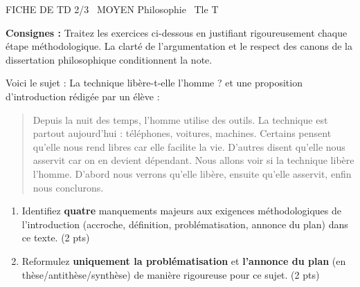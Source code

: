\documentclass[11pt]{article}
\begin{document}
\thispagestyle{empty}

\begin{tcolorbox}[enhanced,colback=popink,colframe=popink,arc=10pt,boxrule=0pt,left=12pt,right=12pt,top=9pt,bottom=9pt]
{\color{white}\popxbold\small FICHE DE TD 2/3 \textbullet\ MOYEN \hfill Philosophie \textbullet\ Tle T\par}
\end{tcolorbox}
\vspace{4pt}

\noindent \textbf{Consignes :} Traitez les exercices ci-dessous en justifiant rigoureusement chaque étape méthodologique. La clarté de l'argumentation et le respect des canons de la dissertation philosophique conditionnent la note.

\begin{exercice}
Voici le sujet : \og La technique libère-t-elle l'homme ? \fg{} et une proposition d'introduction rédigée par un élève :
\begin{quote}
\og Depuis la nuit des temps, l'homme utilise des outils. La technique est partout aujourd'hui : téléphones, voitures, machines. Certains pensent qu'elle nous rend libres car elle facilite la vie. D'autres disent qu'elle nous asservit car on en devient dépendant. Nous allons voir si la technique libère l'homme. D'abord nous verrons qu'elle libère, ensuite qu'elle asservit, enfin nous conclurons. \fg{}
\end{quote}
\begin{enumerate}
    \item Identifiez \textbf{quatre} manquements majeurs aux exigences méthodologiques de l'introduction (accroche, définition, problématisation, annonce du plan) dans ce texte. (2 pts)
    \item Reformulez \textbf{uniquement la problématisation} et \textbf{l'annonce du plan} (en thèse/antithèse/synthèse) de manière rigoureuse pour ce sujet. (2 pts)
\end{enumerate}
\end{exercice}
\end{document}

